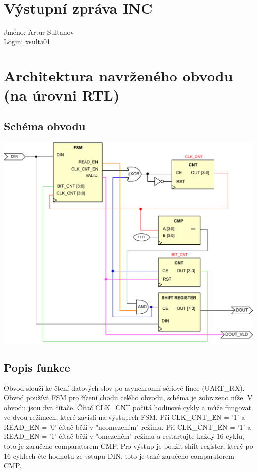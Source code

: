 \documentclass[a4paper, 11pt]{article}
\begin{document}
\section*{\huge{Výstupní zpráva INC}}
Jméno: Artur Sultanov \\
Login: xsulta01
\section{Architektura navrženého obvodu (na úrovni RTL)}
\subsection{Schéma obvodu}
\includegraphics[width=\textwidth,height=\textheight,keepaspectratio]{INC_RTL.pdf}
\subsection{Popis funkce}
Obvod slouží ke čtení datových slov po asynchronní sériové lince (UART\_RX). Obvod používá FSM pro řízení chodu celého obvodu, schéma je zobrazeno níže.
V obvodu jsou dva čítače. Čítač CLK\_CNT počítá hodinové cykly a může fungovat ve dvou režimech, které závislí na výstupech FSM. Při CLK\_CNT\_EN = '1' a READ\_EN = '0' čítač běží v "neomezeném" režimu. Při CLK\_CNT\_EN = '1' a READ\_EN = '1' čítač běží v "omezeném" režimu a restartujte každý 16 cyklu, toto je zaručeno comparatorem CMP. Pro výstup je použit shift register, který po 16 cyklech čte hodnotu ze vstupu DIN, toto je také zaručeno comparatorem CMP.
\end{document}
